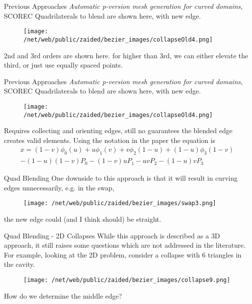 \documentclass[12pt]{beamer}
\newcommand{\spa}{\vspace{0.5cm}\newline}
\begin{document}
\begin{frame}{Previous Approaches}
\textit{Automatic p-version mesh generation for curved domains}, SCOREC \spa
Quadrilaterals to blend are shown here, with new edge.
\begin{figure}
  \centering
  \texttt{[image: /net/web/public/zaided/bezier\_images/collapseOld4.png]} 
\end{figure}
2nd and 3rd orders are shown here. for higher than 3rd, we can either elevate the third, or just use equally spaced points.
\end{frame}
\begin{frame}{Previous Approaches}
\textit{Automatic p-version mesh generation for curved domains}, SCOREC \spa
Quadrilaterals to blend are shown here, with new edge.
\begin{figure}
  \centering
  \texttt{[image: /net/web/public/zaided/bezier\_images/collapseOld4.png]} 
\end{figure}
Requires collecting and orienting edges, still no guarantees the blended edge creates valid elements. Using the notation in the paper the equation is
{\footnotesize
\begin{eqnarray*}
x = (1-v)\phi_0(u)+u\phi_1(v)+v\phi_2(1-u)+(1-u)\phi_3(1-v) \\
- (1-u)(1-v)P_0 - (1-v)uP_1 - uvP_2 -(1-u)vP_3 
\end{eqnarray*}
}
\end{frame}
\begin{frame}{Quad Blending}
 One downside to this approach is that it will result in curving edges unnecessarily, e.g. in the swap,
\begin{figure}
  \centering
  \texttt{[image: /net/web/public/zaided/bezier\_images/swap3.png]} 
\end{figure}
the new edge could (and I think should) be straight.
\end{frame}
\begin{frame}{Quad Blending - 2D Collapses}
While this approach is described as a 3D approach, it still raises some questions which are not addressed in the literature. For example, looking at the 2D problem, consider a collapse with 6 triangles in the cavity.
\begin{figure}
  \centering
  \texttt{[image: /net/web/public/zaided/bezier\_images/collapse9.png]} 
\end{figure}
How do we determine the middle edge?
\end{frame}
\end{document}
